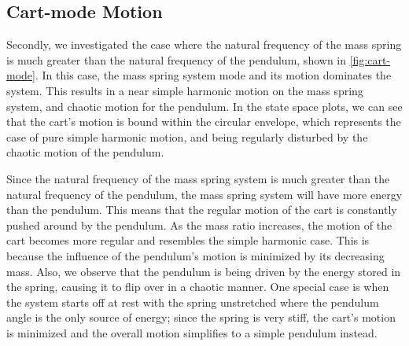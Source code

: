 \documentclass[12pt]{article}
\begin{document}
\subsection{Cart-mode Motion}

Secondly, we investigated the case where the natural frequency of the mass spring is much greater than the natural frequency of the pendulum, shown in \autoref{fig:cart-mode}. In this case, the mass spring system mode and its motion dominates the system. This results in a near simple harmonic motion on the mass spring system, and chaotic motion for the pendulum. In the state space plots, we can see that the cart's motion is bound within the circular envelope, which represents the case of pure simple harmonic motion, and being regularly disturbed by the chaotic motion of the pendulum. 

Since the natural frequency of the mass spring system is much greater than the natural frequency of the pendulum, the mass spring system will have more energy than the pendulum. This means that the regular motion of the cart is constantly pushed around by the pendulum. As the mass ratio increases, the motion of the cart becomes more regular and resembles the simple harmonic case. This is because the influence of the pendulum's motion is minimized by its decreasing mass. Also, we observe that the pendulum is being driven by the energy stored in the spring, causing it to flip over in a chaotic manner. One special case is when the system starts off at rest with the spring unstretched where the pendulum angle is the only source of energy; since the spring is very stiff, the cart's motion is minimized and the overall motion simplifies to a simple pendulum instead.
\end{document}
